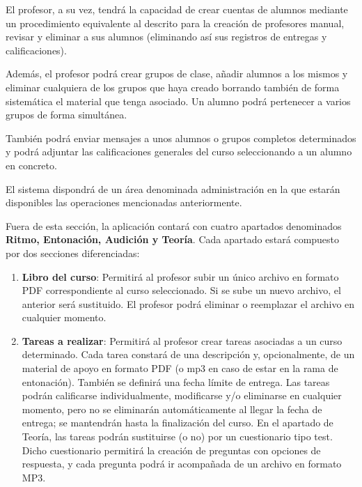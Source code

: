 El profesor, a su vez, tendrá la capacidad de crear cuentas de alumnos mediante un procedimiento equivalente al descrito para la creación de profesores manual, revisar y eliminar a sus alumnos (eliminando así sus registros de entregas y calificaciones).

Además, el profesor podrá crear grupos de clase, añadir alumnos a los mismos y eliminar cualquiera de los grupos que haya creado borrando también de forma sistemática el material que tenga asociado. Un alumno podrá pertenecer a varios grupos de forma simultánea.

También podrá enviar mensajes a unos alumnos o grupos completos determinados y podrá adjuntar las calificaciones generales del curso seleccionando a un alumno en concreto.

El sistema dispondrá de un área denominada administración en la que estarán disponibles las operaciones mencionadas anteriormente.

Fuera de esta sección, la aplicación contará con cuatro apartados denominados \textbf{Ritmo, Entonación, Audición y Teoría}. Cada apartado estará compuesto por dos secciones diferenciadas:
\begin{enumerate}
\item \textbf{Libro del curso}: Permitirá al profesor subir un único archivo en formato PDF correspondiente al curso seleccionado. Si se sube un nuevo archivo, el anterior será sustituido. El profesor podrá eliminar o reemplazar el archivo en cualquier momento.
\item \textbf{Tareas a realizar}: Permitirá al profesor crear tareas asociadas a un curso determinado. Cada tarea constará de una descripción y, opcionalmente, de un material de apoyo en formato PDF (o mp3 en caso de estar en la rama de entonación). También se definirá una fecha límite de entrega. Las tareas podrán calificarse individualmente, modificarse y/o eliminarse en cualquier momento, pero no se eliminarán automáticamente al llegar la fecha de entrega; se mantendrán hasta la finalización del curso. En el apartado de Teoría, las tareas podrán sustituirse (o no) por un cuestionario tipo test. Dicho cuestionario permitirá la creación de preguntas con opciones de respuesta, y cada pregunta podrá ir acompañada de un archivo en formato MP3.
\end{enumerate}

